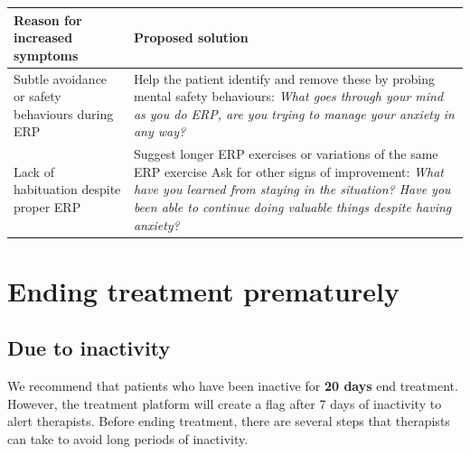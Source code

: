 \documentclass[]{book}
\theoremstyle{definition}
\theoremstyle{definition}
\theoremstyle{definition}
\theoremstyle{remark}
\begin{document}
\begin{longtable}[]{@{}ll@{}}
\toprule
\begin{minipage}[b]{0.47\columnwidth}\raggedright
Reason for increased symptoms\strut
\end{minipage} & \begin{minipage}[b]{0.47\columnwidth}\raggedright
Proposed solution\strut
\end{minipage}\tabularnewline
\midrule
\endhead
\begin{minipage}[t]{0.47\columnwidth}\raggedright
Subtle avoidance or safety behaviours during ERP\strut
\end{minipage} & \begin{minipage}[t]{0.47\columnwidth}\raggedright
Help the patient identify and remove these by probing mental safety
behaviours: \emph{What goes through your mind as you do ERP, are you
trying to manage your anxiety in any way?}\strut
\end{minipage}\tabularnewline
\begin{minipage}[t]{0.47\columnwidth}\raggedright
Lack of habituation despite proper ERP\strut
\end{minipage} & \begin{minipage}[t]{0.47\columnwidth}\raggedright
Suggest longer ERP exercises or variations of the same ERP exercise Ask
for other signs of improvement: \emph{What have you learned from staying
in the situation? Have you been able to continue doing valuable things
despite having anxiety?}\strut
\end{minipage}\tabularnewline
\bottomrule
\end{longtable}

\hypertarget{ending-treatment-prematurely}{%
\section{Ending treatment
prematurely}\label{ending-treatment-prematurely}}

\hypertarget{due-to-inactivity}{%
\subsection{Due to inactivity}\label{due-to-inactivity}}

We recommend that patients who have been inactive for \textbf{20 days}
end treatment. However, the treatment platform will create a flag after
7 days of inactivity to alert therapists. Before ending treatment, there
are several steps that therapists can take to avoid long periods of
inactivity.
\end{document}

